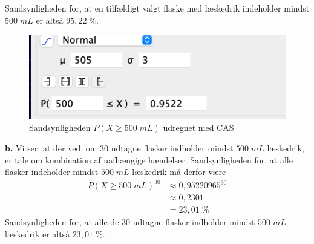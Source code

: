 \documentclass{article}
\begin{document}
Sandsynligheden for, at en tilfældigt valgt flaske med læskedrik indeholder mindst $500 \;\unit{mL} $ er altså $95,22 \;\%$. 
\begin{figure}[H]
\begin{center}
  \includegraphics[width=\textwidth]{500mL.png}
\end{center}
  \caption{Sandsynligheden $P(X \geq 500 \;\unit{mL} )$ udregnet med CAS }
\label{fig:500mL}
\end{figure}
\noindent \textbf{b.}
Vi ser, at der ved, om 30 udtagne flasker indholder mindst $500 \;\unit{mL} $ læskedrik, er tale om kombination af uafhængige hændelser.
Sandsynligheden for, at alle flasker indeholder mindst $500 \;\unit{mL} $ læskedrik må derfor være
\begin{equation*}
\begin{split}
  P(X \geq 500 \;\unit{mL} ) ^{30}&\approx 0,95220965 ^{30}\\
  &\approx 0,2301\\
  &=23,01\;\%
\end{split}
\end{equation*}
Sandsynligheden for, at alle de 30 udtagne flasker indholder mindst $500 \;\unit{mL} $ læskedrik er altså $23,01\;\%$. 
\end{document}
